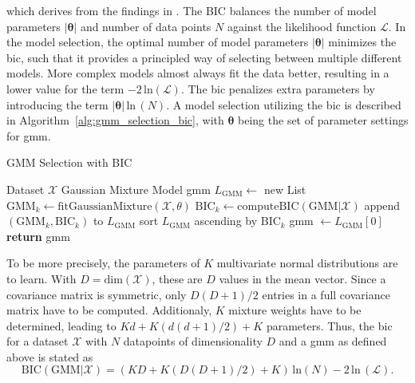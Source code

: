 \documentclass[../../../main.tex]{subfiles}
\begin{document}
which derives from the findings in \cite{schwarz1978estimating}. The BIC balances the number of model parameters $|\bm{\theta}|$ and number of data points $N$ against the likelihood function $\mathcal{L}$. In the model selection, the optimal number of model parameters $|\bm{\theta}|$ minimizes the \gls{bic}, such that it provides a principled way of selecting between multiple different models. More complex models almost always fit the data better, resulting in a lower value for the term $-2 \, \text{ln}(\mathcal{L})$. The \gls{bic} penalizes extra parameters by introducing the term $|\bm{\theta}| \, \text{ln} \, (N)$. A model selection utilizing the \gls{bic} is described in Algorithm~\ref{alg:gmm_selection_bic}, with $\bm{\theta}$ being the set of parameter settings for \gls{gmm}.

\begin{algorithm}
    \caption{GMM Selection with BIC}
    \label{alg:gmm_selection_bic}
    \begin{algorithmic}[1]
        \REQUIRE Dataset $\mathcal{X}$
        \ENSURE Gaussian Mixture Model \gls{gmm}
        \STATE $L_{\text{GMM}} \leftarrow$ new List
            \STATE $\text{GMM}_k \leftarrow \text{fitGaussianMixture}(\mathcal{X}, \theta)$
            \STATE $\text{BIC}_k \leftarrow \text{computeBIC}(\text{GMM}|\mathcal{X})$
            \STATE append $(\text{GMM}_k, \text{BIC}_k)$ to $L_{\text{GMM}}$
        \ENDFOR
        \STATE sort $L_{\text{GMM}}$ ascending by $\text{BIC}_k$ 
        \STATE \gls{gmm} $\leftarrow L_{\text{GMM}}[0]$ 
        \STATE \textbf{return} \gls{gmm} 
    \end{algorithmic}
 \end{algorithm}

To be more precisely, the parameters of $K$ multivariate normal distributions are to learn. With $D = \text{dim}(\mathcal{X})$, these are $D$ values in the mean vector. Since a covariance matrix is symmetric, only $D(D+1)/2$ entries in a full covariance matrix have to be computed. Additionaly, $K$ mixture weights have to be determined, leading to $Kd + K(d(d+1)/2)+K$ parameters. Thus, the \gls{bic} for a dataset $\mathcal{X}$ with $N$ datapoints of dimensionality $D$ and a \gls{gmm} as defined above is stated as 
\begin{equation}\label{eq:bic}
    \text{BIC}(\text{GMM}|\mathcal{X}) = (KD + K(D(D+1)/2)+K) \, \text{ln}(N) - 2 \, \text{ln} \, (\mathcal{L}).
\end{equation}
\end{document}
